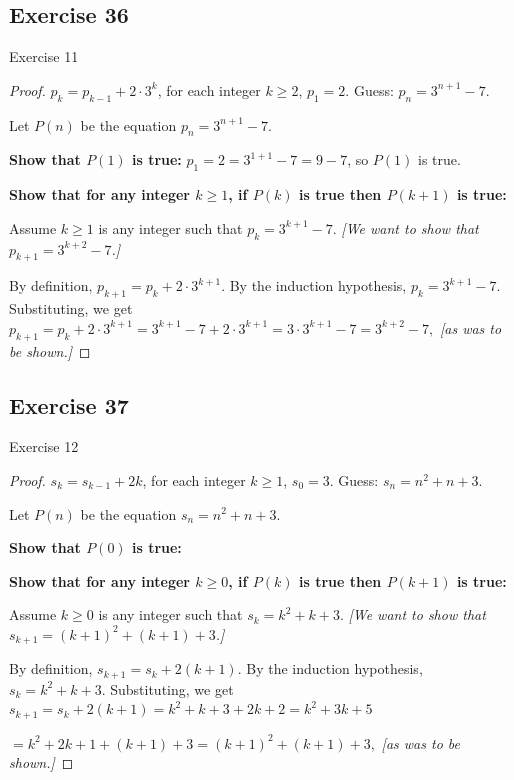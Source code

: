 \documentclass[14pt]{extarticle}
\newcommand{\dps}{\displaystyle}
\begin{document}
\subsection{Exercise 36}
Exercise 11

\begin{proof}
\(p_k = p_{k-1} + 2 \cdot 3^k\), for each integer \(k \geq 2\), \(p_1 = 2\). Guess: \(\dps p_n = 3^{n+1} - 7\).

Let $P(n)$ be the equation \(p_n = 3^{n+1} - 7\).

{\bf Show that \(P(1)\) is true:} \(p_1 = 2 = 3^{1+1} - 7 = 9-7\), so $P(1)$ is true.

{\bf Show that for any integer \(k \geq 1\), if \(P(k)\) is true then \(P(k+1)\) is true:}

Assume \(k \geq 1\) is any integer such that \(p_k = 3^{k+1} - 7\). 
{\it [We want to show that \(\dps p_{k+1} = 3^{k+2} - 7\).]}

By definition, \(p_{k+1} = p_k + 2 \cdot 3^{k+1}\).
By the induction hypothesis, \(p_k = 3^{k+1} - 7\). 
Substituting, we get
\(
p_{k+1} = p_k + 2 \cdot 3^{k+1} = 3^{k+1} - 7 + 2 \cdot 3^{k+1} = 3 \cdot 3^{k+1} - 7 = 3^{k+2} - 7,
\)
{\it [as was to be shown.]}
\end{proof}

\subsection{Exercise 37}
Exercise 12

\begin{proof}
\(s_k = s_{k-1} + 2k\), for each integer \(k \geq 1\), \(s_0 = 3\). Guess: \(s_n = n^2 + n + 3\).

Let $P(n)$ be the equation \(s_n = n^2 + n + 3\).

{\bf Show that \(P(0)\) is true:}

{\bf Show that for any integer \(k \geq 0\), if \(P(k)\) is true then \(P(k+1)\) is true:}

Assume \(k \geq 0\) is any integer such that \(s_k = k^2 + k + 3\). 
{\it [We want to show that \(s_{k+1} = (k+1)^2 + (k+1) + 3\).]}

By definition, \(s_{k+1} = s_k + 2(k+1)\).
By the induction hypothesis, \(s_k = k^2 + k + 3\).
Substituting, we get \(s_{k+1} = s_k + 2(k+1) = k^2 + k + 3 + 2k + 2 = k^2 + 3k + 5\)

\(= k^2 + 2k + 1 + (k+1) + 3 = (k+1)^2 + (k+1) + 3,\)
{\it [as was to be shown.]}
\end{proof}
\end{document}
